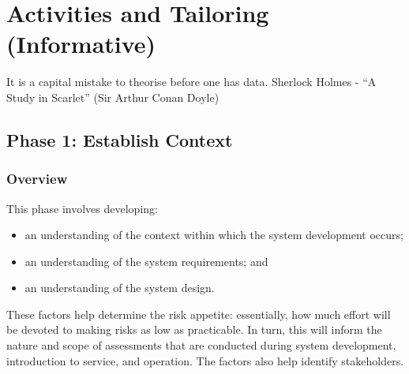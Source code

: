 %
%
\chapter{Activities and Tailoring (Informative)}\label{bkm:activitiestailoring}

\dsiwgSectionQuote
  {It is a capital mistake to theorise before one has data.}
  {Sherlock Holmes - ``A Study in Scarlet'' (Sir Arthur Conan Doyle)}


\section{Phase 1: Establish Context}
\subsection{Overview}
This phase involves developing:
\begin{itemize}
	\item an understanding of the context within which the system development occurs; 
	\item an understanding of the system requirements; and 
	\item an understanding of the system design.
\end{itemize}

These factors help determine the risk appetite: essentially, how much effort will be devoted to making risks as low as practicable. In turn, this will inform the nature and scope of assessments that are conducted during system development, introduction to service, and operation. The factors also help identify \glspl{stakeholder}.

